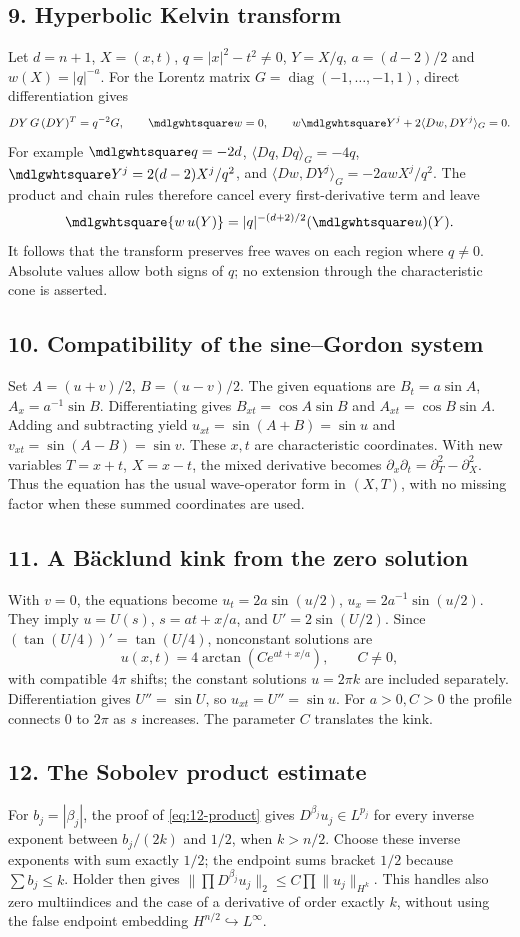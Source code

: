 \subsection*{9. Hyperbolic Kelvin transform}
Let $d=n+1$, $X=(x,t)$, $q=|x|^2-t^2\ne0$,
$Y=X/q$, $a=(d-2)/2$ and $w(X)=|q|^{-a}$.
For the Lorentz matrix $G=\operatorname{diag}(-1,\ldots,-1,1)$,
direct differentiation gives
\[
 DY\,G\,(DY)^T=q^{-2}G,\qquad \PDEWave w=0,
 \qquad w\PDEWave Y^j+2\langle Dw,DY^j\rangle_G=0.
\]
For example $\PDEWave q=-2d$, $\langle Dq,Dq\rangle_G=-4q$,
$\PDEWave Y^j=2(d-2)X^j/q^2$, and
$\langle Dw,DY^j\rangle_G=-2awX^j/q^2$.
The product and chain rules therefore cancel every first-derivative
term and leave
\[
 \PDEWave\{w\,u(Y)\}=|q|^{-(d+2)/2}(\PDEWave u)(Y).
\]
It follows that the transform preserves free waves on each region
where $q\ne0$. Absolute values allow both signs of $q$;
no extension through the characteristic cone is asserted.

\subsection*{10. Compatibility of the sine--Gordon system}
Set $A=(u+v)/2$, $B=(u-v)/2$. The given equations are
$B_t=a\sin A$, $A_x=a^{-1}\sin B$.
Differentiating gives $B_{xt}=\cos A\sin B$ and
$A_{xt}=\cos B\sin A$. Adding and subtracting yield
$u_{xt}=\sin(A+B)=\sin u$ and
$v_{xt}=\sin(A-B)=\sin v$.
These $x,t$ are characteristic coordinates. With new variables
$T=x+t$, $X=x-t$, the mixed derivative becomes
$\partial_x\partial_t=\partial_T^2-\partial_X^2$.
Thus the equation has the usual wave-operator form in $(X,T)$,
with no missing factor when these summed coordinates are used.

\subsection*{11. A B\"acklund kink from the zero solution}
With $v=0$, the equations become
$u_t=2a\sin(u/2)$, $u_x=2a^{-1}\sin(u/2)$.
They imply $u=U(s)$, $s=at+x/a$, and $U'=2\sin(U/2)$.
Since $(\tan(U/4))'=\tan(U/4)$, nonconstant solutions are
\[
 u(x,t)=4\arctan(Ce^{at+x/a}),\qquad C\ne0,
\]
with compatible $4\pi$ shifts; the constant solutions $u=2\pi k$
are included separately. Differentiation gives $U''=\sin U$, so
$u_{xt}=U''=\sin u$. For $a>0,C>0$ the profile connects $0$ to
$2\pi$ as $s$ increases. The parameter $C$ translates the kink.

\subsection*{12. The Sobolev product estimate}
For $b_j=|\beta_j|$, the proof of \eqref{eq:12-product} gives
$D^{\beta_j}u_j\in L^{p_j}$ for every inverse exponent between
$b_j/(2k)$ and $1/2$, when $k>n/2$.
Choose these inverse exponents with sum exactly $1/2$; the endpoint
sums bracket $1/2$ because $\sum b_j\le k$.
Holder then gives
$\|\prod D^{\beta_j}u_j\|_2\le C\prod\|u_j\|_{H^k}$.
This handles also zero multiindices and the case of a derivative
of order exactly $k$, without using the false endpoint embedding
$H^{n/2}\hookrightarrow L^\infty$.

